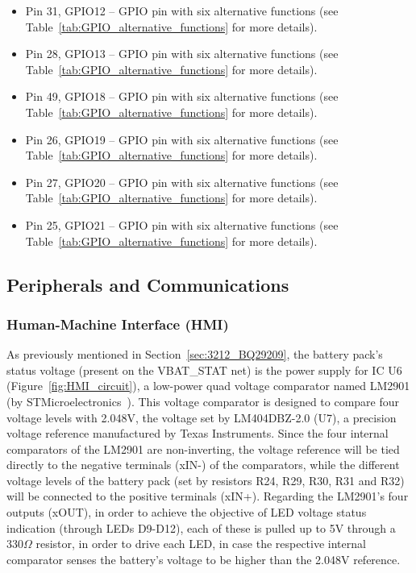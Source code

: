 \begin{itemize}
	\item Pin 31, GPIO12 -- GPIO pin with six alternative functions (see Table~\ref{tab:GPIO_alternative_functions} for more details).

	\item Pin 28, GPIO13 -- GPIO pin with six alternative functions (see Table~\ref{tab:GPIO_alternative_functions} for more details).

	\item Pin 49, GPIO18 -- GPIO pin with six alternative functions (see Table~\ref{tab:GPIO_alternative_functions} for more details).

	\item Pin 26, GPIO19 -- GPIO pin with six alternative functions (see Table~\ref{tab:GPIO_alternative_functions} for more details).

	\item Pin 27, GPIO20 -- GPIO pin with six alternative functions (see Table~\ref{tab:GPIO_alternative_functions} for more details).

	\item Pin 25, GPIO21 -- GPIO pin with six alternative functions (see Table~\ref{tab:GPIO_alternative_functions} for more details).
\end{itemize}


\subsection{Peripherals and Communications}\label{sec:323_PERIPHERALS_COMMS}


\subsubsection{Human-Machine Interface (HMI)}\label{sec:3231_BACKPANEL}

As previously mentioned in Section~\ref{sec:3212_BQ29209}, the battery pack's status voltage (present on the VBAT\_STAT net) is the power supply for IC U6 (Figure~\ref{fig:HMI_circuit}), a low-power quad voltage comparator named LM2901 (by STMicroelectronics~\cite{LM2901}). This voltage comparator is designed to compare four voltage levels with 2.048V, the voltage set by LM404DBZ-2.0 (U7), a precision voltage reference manufactured by Texas Instruments. Since the four internal comparators of the LM2901 are non-inverting, the voltage reference will be tied directly to the negative terminals (xIN-) of the comparators, while the different voltage levels of the battery pack (set by resistors R24, R29, R30, R31 and R32) will be connected to the positive terminals (xIN+). Regarding the LM2901's four outputs (xOUT), in order to achieve the objective of LED voltage status indication (through LEDs D9-D12), each of these is pulled up to 5V through a 330$\Omega$ resistor, in order to drive each LED, in case the respective internal comparator senses the battery's voltage to be higher than the 2.048V reference.

